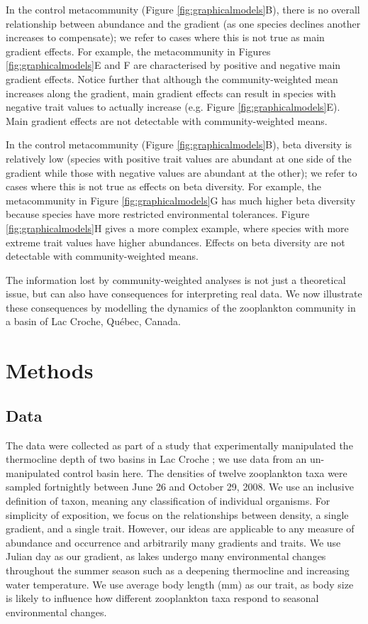\documentclass[12pt]{ecology}
\begin{document}
In the control metacommunity (Figure \ref{fig:graphicalmodels}B), there is no overall relationship between abundance and the gradient (as one species declines another increases to compensate); we refer to cases where this is not true as main gradient effects.  For example, the metacommunity in Figures \ref{fig:graphicalmodels}E and F are characterised by positive and negative main gradient effects.  Notice further that although the community-weighted mean increases along the gradient, main gradient effects can result in species with negative trait values to actually increase (e.g. Figure \ref{fig:graphicalmodels}E).  Main gradient effects are not detectable with community-weighted means.

In the control metacommunity (Figure \ref{fig:graphicalmodels}B), beta diversity is relatively low (species with positive trait values are abundant at one side of the gradient while those with negative values are abundant at the other); we refer to cases where this is not true as effects on beta diversity.  For example, the metacommunity in Figure \ref{fig:graphicalmodels}G has much higher beta diversity because species have more restricted environmental tolerances.  Figure \ref{fig:graphicalmodels}H gives a more complex example, where species with more extreme trait values have higher abundances.  Effects on beta diversity are not detectable with community-weighted means.

The information lost by community-weighted analyses is not just a theoretical issue, but can also have consequences for interpreting real data.  We now illustrate these consequences by modelling the dynamics of the zooplankton community in a basin of Lac Croche, Qu\'{e}bec, Canada.

\section{Methods}

\subsection{Data}

The data were collected as part of a study that experimentally manipulated the thermocline depth of two basins in Lac Croche \citep{CantinEtAl2011}; we use data from an un-manipulated control basin here.  The densities of twelve zooplankton taxa were sampled fortnightly between June 26 and October 29, 2008.  We use an inclusive definition of taxon, meaning any classification of individual organisms.  For simplicity of exposition, we focus on the relationships between density, a single gradient, and a single trait.  However, our ideas are applicable to any measure of abundance and occurrence and arbitrarily many gradients and traits.  We use Julian day as our gradient, as lakes undergo many environmental changes throughout the summer season such as a deepening thermocline and increasing water temperature.  We use average body length (mm) as our trait, as body size is likely to influence how different zooplankton taxa respond to seasonal environmental changes.   %
\end{document}
